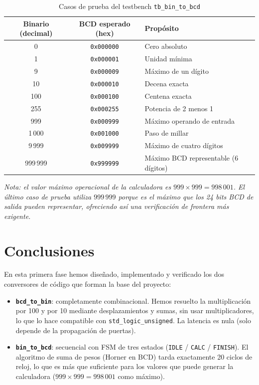 \documentclass[memoria_final]{subfiles}
\begin{document}
	\begin{table}[H]
		\centering
		\caption{Casos de prueba del testbench \texttt{tb\_bin\_to\_bcd}}
		\begin{tabular}{ccl}
			\toprule
			\textbf{Binario (decimal)} & \textbf{BCD esperado (hex)} & \textbf{Propósito} \\
			\midrule
			0         & \texttt{0x000000} & Cero absoluto \\
			1         & \texttt{0x000001} & Unidad mínima \\
			9         & \texttt{0x000009} & Máximo de un dígito \\
			10        & \texttt{0x000010} & Decena exacta \\
			100       & \texttt{0x000100} & Centena exacta \\
			255       & \texttt{0x000255} & Potencia de 2 menos 1 \\
			999       & \texttt{0x000999} & Máximo operando de entrada \\
			1\,000    & \texttt{0x001000} & Paso de millar \\
			9\,999    & \texttt{0x009999} & Máximo de cuatro dígitos \\
			999\,999  & \texttt{0x999999} & Máximo BCD representable (6 dígitos) \\
			\bottomrule
		\end{tabular}
		\label{tab:tb-bin2bcd}
	\end{table}
	
	\noindent
	\textit{Nota: el valor máximo operacional de la calculadora es $999 \times 999 = 998\,001$.
		El último caso de prueba utiliza $999\,999$ porque es el máximo que los 24 bits BCD de
		salida pueden representar, ofreciendo así una verificación de frontera más exigente.}
	
	\FloatBarrier
	
	\section{Conclusiones}
	
	En esta primera fase hemos diseñado, implementado y verificado los dos conversores de código que forman la base del proyecto:
	
	\begin{itemize}[leftmargin=1.6cm, itemsep=4pt]
		\item \textbf{\texttt{bcd\_to\_bin}}: completamente combinacional. Hemos resuelto la multiplicación por 100 y por 10 mediante desplazamientos y sumas, sin usar multiplicadores, lo que lo hace compatible con \texttt{std\_logic\_unsigned}. La latencia es nula (solo depende de la propagación de puertas).
		
		\item \textbf{\texttt{bin\_to\_bcd}}: secuencial con FSM de tres estados (\texttt{IDLE} / \texttt{CALC} / \texttt{FINISH}). El algoritmo de suma de pesos (Horner en BCD) tarda exactamente 20 ciclos de reloj, lo que es más que suficiente para los valores que puede generar la calculadora ($999 \times 999 = 998\,001$ como máximo).
	\end{itemize}
	
\end{document}
